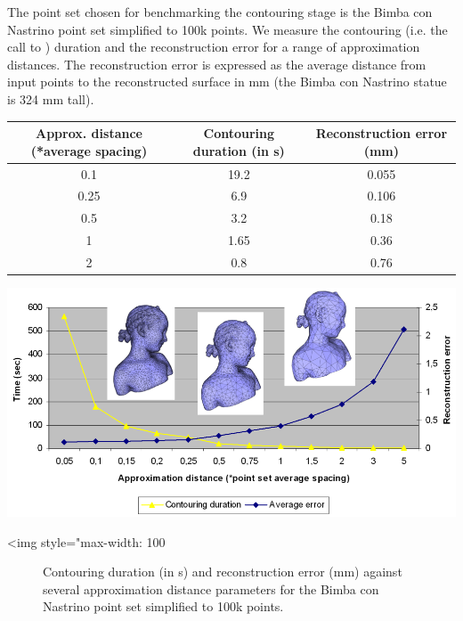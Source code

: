 The point set chosen for benchmarking the contouring stage is the Bimba con Nastrino point set simplified to 100k points. We measure the contouring (i.e. the call to ) duration and the reconstruction error for a range of approximation distances.
The reconstruction error is expressed as the average distance from input points to the reconstructed surface in mm (the Bimba con Nastrino statue is 324 mm tall).

\begin{tabular}{|c|c|c|}
  \hline
  Approx. distance (*average spacing)    & Contouring duration (in s) & Reconstruction error (mm) \\
  \hline
  0.1                                    & 19.2                       & 0.055 \\
  0.25                                   & 6.9                        & 0.106 \\
  0.5                                    & 3.2                        & 0.18 \\
  1                                      & 1.65                        & 0.36 \\
  2                                      & 0.8                         & 0.76 \\
  \hline
\end{tabular}


\begin{center}
    \begin{ccTexOnly}
      \includegraphics[width=1.0\textwidth]{Surface_reconstruction_points_3/contouring_bench}
    \end{ccTexOnly}
    \begin{ccHtmlOnly}
        <img style="max-width: 100%
    \end{ccHtmlOnly}
    \begin{figure}[h]
        \caption{Contouring duration (in s) and reconstruction error (mm)
                 against several approximation distance parameters
                 for the Bimba con Nastrino point set simplified to 100k points.}
        \label{Surface_reconstruction_points_3-fig-contouring_bench}
    \end{figure}
\end{center}
 



